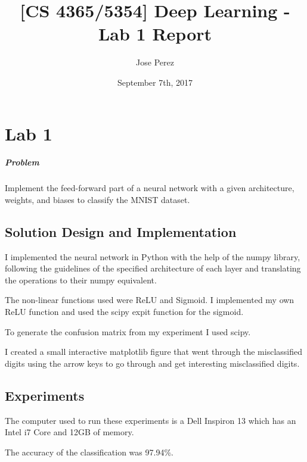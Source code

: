 \documentclass[12pt,letterpaper]{report}
\author{Jose Perez}
\title{[CS 4365/5354] Deep Learning - Lab 1 Report}
\date{September 7th, 2017}
\begin{document}
	\captionsetup{labelfont=bf}
	\maketitle
	\newpage
    
	\tableofcontents
	\chapter{Lab 1}

	\paragraph{Problem}
		Implement the feed-forward part of a neural network with a given architecture, weights, and biases to classify the MNIST dataset.

	\section{Solution Design and Implementation}	
    	I implemented the neural network in Python with the help of the numpy library, following the guidelines of the specified architecture of each layer and translating the operations to their numpy equivalent.
        
   		The non-linear functions used were ReLU and Sigmoid. I implemented my own ReLU function and used the scipy expit function for the sigmoid.
        
        To generate the confusion matrix from my experiment I used scipy.
        
        I created a small interactive matplotlib figure that went through the misclassified digits using the arrow keys to go through and get interesting misclassified digits.

	\section{Experiments}
The computer used to run these experiments is a Dell Inspiron 13 which has an Intel i7 Core and 12GB of memory.
    
The accuracy of the classification was 97.94\%.
    
\end{document}
